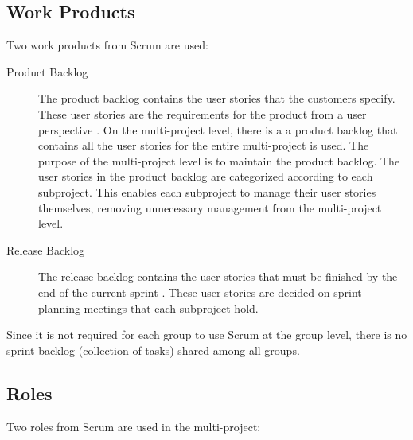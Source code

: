 
\subsection{Work Products}
Two work products from Scrum are used:

\begin{description}
  \item[Product Backlog] The product backlog contains the user stories that the customers specify. These user stories are the requirements for the product from a user perspective \parencite{larman2003}. On the multi-project level, there is a a product backlog that contains all the user stories for the entire multi-project is used. The purpose of the multi-project level is to maintain the product backlog. The user stories in the product backlog are categorized according to each subproject. This enables each subproject to manage their user stories themselves, removing unnecessary management from the multi-project level.
  \item[Release Backlog] The release backlog contains the user stories that must be finished by the end of the current sprint \parencite{larman2003}. These user stories are decided on sprint planning meetings that each subproject hold.
\end{description}

Since it is not required for each group to use Scrum at the group level, there is no sprint backlog (collection of tasks) shared among all groups.

\subsection{Roles}
Two roles from Scrum are used in the multi-project:

